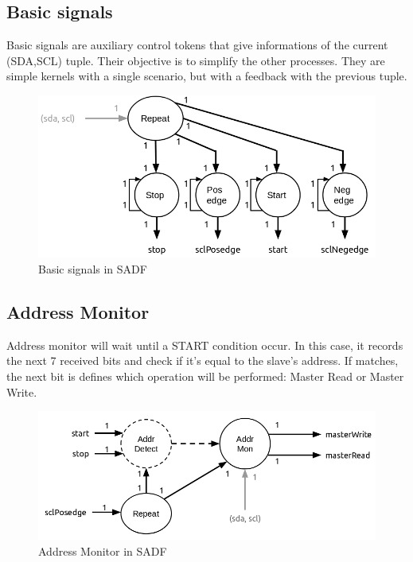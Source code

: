 \documentclass{article}
\begin{document}
\subsection{Basic signals}
Basic signals are auxiliary control tokens that give informations of the current (SDA,SCL) tuple. Their objective is to simplify the other processes. They are simple kernels with a single scenario, but with a feedback with the previous tuple.
\begin{figure}
  \includegraphics[width=\linewidth]{img/block_basic.png}
  \caption{Basic signals in SADF}
  \label{fig:block_basic}
\end{figure}

\subsection{Address Monitor}
Address monitor will wait until a START condition occur. In this case, it records the next 7 received bits and check if it's equal to the slave's address. If matches, the next bit is defines which operation will be performed: Master Read or Master Write.
\begin{figure}
  \includegraphics[width=\linewidth]{img/block_address.png}
  \caption{Address Monitor in SADF}
  \label{fig:block_address}
\end{figure}
\end{document}
